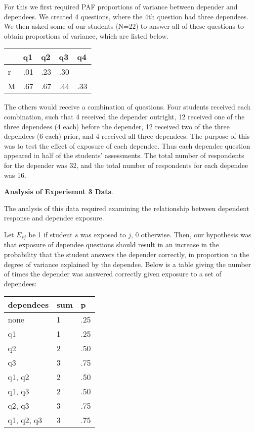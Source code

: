 \documentclass[a4paper,twocolumn]{article}
\begin{document}
For this we first required PAF proportions of variance between depender and
dependees.  We created 4 questions, where the 4th question had three dependees.
We then asked some of our students (N=22) to answer all of these questions to
obtain proportions of variance, which are listed below.  

\begin{center}
\begin{tabular}{|l|l|l|l|l|}
                                \hline
    &   q1 &  q2  & q3 & q4  \\ \hline
 r  &  .01 & .23 & .30 &     \\ \hline
 M  &  .67 & .67 & .44 & .33 \\ \hline
\end{tabular}
\end{center}

The others would receive a combination of questions. Four students received each
combination, such that 4 received the depender outright, 12 received one of the
three dependees (4 each) before the depender, 12 received two of the three
dependees (6 each) prior, and 4 received all three dependees.  The purpose of
this was to test the effect of exposure of each dependee.  Thus each dependee
question appeared in half of the students' assessments.  The total number of
respondents for the depender was 32, and the total number of respondents for
each dependee was 16. 

\textbf{Analysis of Experiemnt 3 Data}. 

The analysis of this data required examining the relationship between
dependent response and dependee exposure.

Let $E_{sj}$ be 1 if student $s$ was exposed to $j$, 0 otherwise.  Then, our
hypothesis was that exposure of dependee questions should result in an increase
in the probability that the student answers the depender correctly, in
proportion to the degree of variance explained by the dependee.  Below is a
table giving the number of times the depender was answered correctly given
exposure to a set of dependees:

\begin{center}
\begin{tabular}{|l|l|l|}
\hline
dependees    & sum &  p   \\ \hline
none         &  1  & .25  \\ \hline
q1           &  1  & .25  \\ \hline
q2           &  2  & .50  \\ \hline
q3           &  3  & .75  \\ \hline
q1, q2       &  2  & .50  \\ \hline
q1, q3       &  2  & .50  \\ \hline
q2, q3       &  3  & .75  \\ \hline
q1, q2, q3   &  3  & .75  \\ \hline
\end{tabular}
\end{center}
\end{document}
